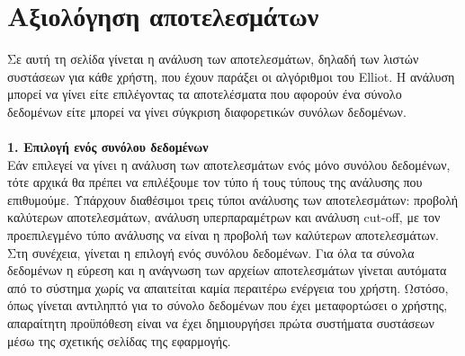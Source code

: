\section{Αξιολόγηση αποτελεσμάτων}
\noindent Σε αυτή τη σελίδα γίνεται η ανάλυση των αποτελεσμάτων, δηλαδή των λιστών συστάσεων για κάθε χρήστη, που έχουν παράξει οι αλγόριθμοι του Elliot. Η ανάλυση μπορεί να γίνει είτε επιλέγοντας τα αποτελέσματα που αφορούν ένα σύνολο δεδομένων είτε μπορεί να γίνει σύγκριση διαφορετικών συνόλων δεδομένων.\\\\
\textbf{1. Επιλογή ενός συνόλου δεδομένων}\\
Εάν επιλεγεί να γίνει η ανάλυση των αποτελεσμάτων ενός μόνο συνόλου δεδομένων, τότε αρχικά θα πρέπει να επιλέξουμε τον τύπο ή τους τύπους της ανάλυσης που επιθυμούμε. Υπάρχουν διαθέσιμοι τρεις τύποι ανάλυσης των αποτελεσμάτων: προβολή καλύτερων αποτελεσμάτων, ανάλυση υπερπαραμέτρων και ανάλυση cut-off, με  τον προεπιλεγμένο τύπο ανάλυσης να είναι η προβολή των καλύτερων αποτελεσμάτων.
\\Στη συνέχεια, γίνεται η επιλογή ενός συνόλου δεδομένων. Για όλα τα σύνολα δεδομένων η εύρεση και η ανάγνωση των αρχείων αποτελεσμάτων γίνεται αυτόματα από το σύστημα χωρίς να απαιτείται καμία περαιτέρω ενέργεια του χρήστη. Ωστόσο, όπως γίνεται αντιληπτό για το σύνολο δεδομένων που έχει μεταφορτώσει ο χρήστης, απαραίτητη προϋπόθεση είναι να έχει δημιουργήσει πρώτα συστήματα συστάσεων μέσω της σχετικής σελίδας της εφαρμογής. 

